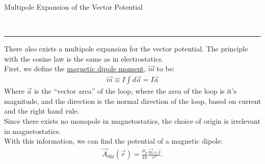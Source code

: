 \documentclass{article}
\newcommand{\header}[1]{\begin{large}\noindent #1\end{large}\\\rule{\textwidth}{0.5pt}}
\newcommand{\sgap}{\smallskip\\}
\begin{document}
\header{Multipole Expansion of the Vector Potential}
There also exists a multipole expansion for the vector potential. The principle with the 
cosine law is the same as in electrostatics.
\sgap
First, we define the \underline{magnetic dipole moment}, $\vec{m}$ to be:
\begin{align*}
    \vec{m} \equiv I \int d\vec{a} = I \vec{a}
\end{align*}
Where $\vec{a}$ is the ``vector area'' of the loop, where the area of the loop is it's 
magnitude, and the direction is the normal direction of the loop, based on current
and the right hand rule.
\sgap
Since there exists no monopole in magnetostatics, the choice of origin is irrelevant in 
magnetostatics. 
\sgap
With this information, we can find the potential of a magnetic dipole:
\begin{align*}
    \vec{A}_\textrm{dip}(\vec{r}) = \frac{\mu_0}{4\pi} \frac{\vec{m} \times \hat{r}}{r^2}.
\end{align*}
\pagebreak
\end{document}
